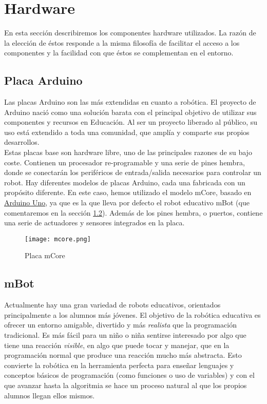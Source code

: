 \section{Hardware}\label{sec:hardware}
En esta sección describiremos los componentes hardware utilizados. La razón de la elección de éstos responde a la misma filosofía de facilitar el acceso a los componentes y la facilidad con que éstos se complementan en el entorno.
\subsection{Placa Arduino}\label{subsec:placaBase}
Las placas Arduino son las más extendidas en cuanto a robótica. El proyecto de Arduino \cite{arduinoURL} nació como una solución barata con el principal objetivo de utilizar sus componentes y recursos en Educación. Al ser un proyecto liberado al público, su uso está extendido a toda una comunidad, que amplía y comparte sus propios desarrollos.\\
Estas placas base son hardware libre, uno de las principales razones de su bajo coste. Contienen un procesador re-programable y una serie de pines hembra, donde se conectarán los periféricos de entrada/salida necesarios para controlar un robot. Hay diferentes modelos de placas Arduino, cada una fabricada con un propósito diferente. En este caso, hemos utilizado el modelo mCore, basado en \href{https://arduino.cl/producto/arduino-uno/}{Arduino Uno}, ya que es la que lleva por defecto el robot educativo mBot (que comentaremos en la sección \ref{subsec:mbot}). Además de los pines hembra, o puertos, contiene una serie de actuadores y sensores integrados en la placa.
\begin{figure}[H]
		\texttt{[image: mcore.png]}\centering
	\label{img:Mcore}
	\caption{Placa mCore}
\end{figure}
\subsection{mBot}\label{subsec:mbot}
Actualmente hay una gran variedad de robots educativos, orientados principalmente a los alumnos más jóvenes. El objetivo de la robótica educativa es ofrecer un entorno amigable, divertido y más \textit{realista} que la programación tradicional. Es más fácil para un niño o niña sentirse interesado por algo que tiene una reacción \textit{visible}, en algo que puede tocar y manejar, que en la programación normal que produce una reacción mucho más abstracta. Esto convierte la robótica en la herramienta perfecta para enseñar lenguajes y conceptos básicos de programación (como funciones o uso de variables) y con el que avanzar hasta la algoritmia se hace un proceso natural al que los propios alumnos llegan ellos mismos. \\

